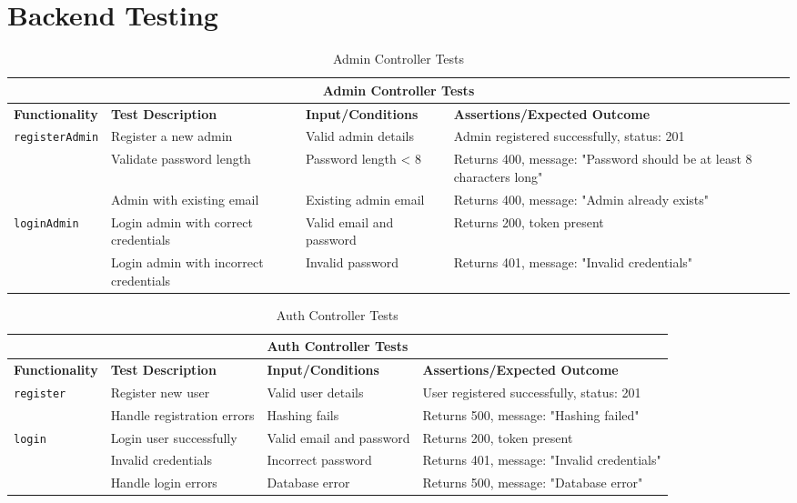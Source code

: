 \section{Backend Testing}
\label{sec:backend_testing}

\begin{table}[ht]
\centering
\begin{tabular}{|p{3.2cm}|p{4cm}|p{3.5cm}|p{5cm}|}
\hline
\multicolumn{4}{|c|}{\textbf{Admin Controller Tests}} \\ 
\hline
\textbf{Functionality} & \textbf{Test Description} & \textbf{Input/Conditions} & \textbf{Assertions/Expected Outcome} \\
\hline
\multirow{3}{*}{\texttt{registerAdmin}}
 & Register a new admin          & Valid admin details   & Admin registered successfully, status: 201 \\ \cline{2-4}
 & Validate password length      & Password length < 8   & Returns 400, message: "Password should be at least 8 characters long" \\ \cline{2-4}
 & Admin with existing email     & Existing admin email  & Returns 400, message: "Admin already exists" \\
\hline
\multirow{2}{*}{\texttt{loginAdmin}}
 & Login admin with correct credentials   & Valid email and password  & Returns 200, token present \\ \cline{2-4}
 & Login admin with incorrect credentials & Invalid password          & Returns 401, message: "Invalid credentials" \\
\hline
\end{tabular}
\caption{Admin Controller Tests}
\label{tab:admin_controller_tests}
\end{table}


\begin{table}[ht]
\centering
\begin{tabular}{|p{3.2cm}|p{4cm}|p{3.5cm}|p{5cm}|}
\hline
\multicolumn{4}{|c|}{\textbf{Auth Controller Tests}} \\ 
\hline
\textbf{Functionality} & \textbf{Test Description} & \textbf{Input/Conditions} & \textbf{Assertions/Expected Outcome} \\
\hline
\multirow{2}{*}{\texttt{register}}
 & Register new user             & Valid user details         & User registered successfully, status: 201 \\ \cline{2-4}
 & Handle registration errors    & Hashing fails              & Returns 500, message: "Hashing failed" \\
\hline
\multirow{3}{*}{\texttt{login}}
 & Login user successfully       & Valid email and password   & Returns 200, token present \\ \cline{2-4}
 & Invalid credentials           & Incorrect password         & Returns 401, message: "Invalid credentials" \\ \cline{2-4}
 & Handle login errors           & Database error            & Returns 500, message: "Database error" \\
\hline
\end{tabular}
\caption{Auth Controller Tests}
\label{tab:auth_controller_tests}
\end{table}

